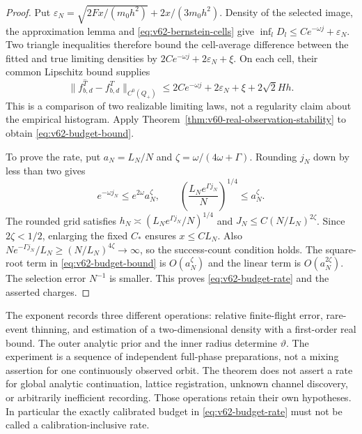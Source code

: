 \begin{proof}
Put
$\varepsilon_N=\sqrt{2Fx/(m_0h^2)}+2x/(3m_0h^2)$.
Density of the selected image, the approximation lemma and
\eqref{eq:v62-bernstein-cells} give
$\inf_lD_l\le Ce^{-\omega j}+\varepsilon_N$.
Two triangle inequalities therefore bound the cell-average difference
between the fitted and true limiting densities by
$2Ce^{-\omega j}+2\varepsilon_N+\xi$.  On each cell, their common
Lipschitz bound supplies
\begin{equation}\label{eq:v62-cells-to-uniform}
 \|f^{\widehat T}_{b,d}-f^T_{b,d}\|_{C^0(Q_+)}
       \le2Ce^{-\omega j}+2\varepsilon_N+\xi+2\sqrt2 Hh.
\end{equation}
This is a comparison of two realizable limiting laws, not a regularity
claim about the empirical histogram.  Apply
Theorem~\ref{thm:v60-real-observation-stability} to obtain
\eqref{eq:v62-budget-bound}.

To prove the rate, put $a_N=L_N/N$ and
$\zeta=\omega/(4\omega+\Gamma)$.  Rounding $j_N$ down by less than
two gives
\[
 e^{-\omega j_N}\le e^{2\omega}a_N^\zeta,
 \qquad \left(\frac{L_Ne^{\Gamma j_N}}N\right)^{1/4}
                                      \le a_N^\zeta.
\]
The rounded grid satisfies $h_N\asymp
(L_Ne^{\Gamma j_N}/N)^{1/4}$ and
$J_N\le C(N/L_N)^{2\zeta}$.  Since $2\zeta<1/2$, enlarging the
fixed $C_*$ ensures $x\le C L_N$.  Also
$Ne^{-\Gamma j_N}/L_N\ge (N/L_N)^{4\zeta}\to\infty$,
so the success-count condition holds.  The square-root term in
\eqref{eq:v62-budget-bound} is $O(a_N^\zeta)$ and the linear term
is $O(a_N^{2\zeta})$.  The selection error $N^{-1}$ is smaller.
This proves \eqref{eq:v62-budget-rate} and the asserted charges.
\end{proof}

The exponent records three different operations: relative finite-flight
error, rare-event thinning, and estimation of a two-dimensional density
with a first-order real bound.  The outer analytic prior and the inner
radius determine $\vartheta$.  The experiment is a sequence of independent
full-phase preparations, not a mixing assertion for one continuously
observed orbit.  The theorem does not assert a rate for global analytic
continuation, lattice registration, unknown channel discovery, or
arbitrarily inefficient recording.  Those operations retain their own
hypotheses.  In particular the exactly calibrated budget in
\eqref{eq:v62-budget-rate} must not be called a calibration-inclusive rate.

